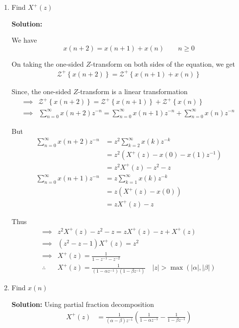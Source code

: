 \documentclass[journal,12pt,twocolumn]{IEEEtran}
\newcommand{\solution}{\noindent \textbf{Solution: }}
\providecommand{\brak}[1]{\ensuremath{\left(#1\right)}}
\providecommand{\cbrak}[1]{\ensuremath{\left\{#1\right\}}}
\providecommand{\abs}[1]{\left\vert#1\right\vert}
\numberwithin{equation}{section}
\renewcommand\thesection{\arabic{section}}
\begin{document}
\begin{enumerate}[label=\thesection.\arabic*,ref=\thesection.\theenumi]
\newpage
\item Find $X^{+}(z)$

\solution 

We have
\begin{equation}
	x(n+2) = x(n+1) + x(n) \qquad n \ge 0
\end{equation}

On taking the one-sided $Z$-transform on both sides of the equation, we get
\begin{align}
	\mathcal{Z}^+\cbrak{x(n+2)} = \mathcal{Z}^+\cbrak{x(n+1) + x(n)}
\end{align}

Since, the one-sided $Z$-transform is a linear transformation
\begin{align}
    \implies &\mathcal{Z}^+\cbrak{x(n + 2)} = \mathcal{Z}^+\cbrak{x(n + 1)} + \mathcal{Z}^+\cbrak{x(n)} \\
    \implies &\sum_{n=0}^\infty x(n+2)z^{-n} = \sum_{n=0}^\infty x(n+1)z^{-n} + \sum_{n=0}^\infty x(n)z^{-n} 
\end{align}

But
\begin{align}
	\sum_{n=0}^\infty x(n+2)z^{-n} &= z^2 \sum_{k=2}^\infty x(k) z^{-k} \\
	&= z^2 \brak{X^+(z) - x(0) - x(1) z^{-1}} \\
	&= z^2 X^+(z) - z^2 - z \\
	\sum_{n=0}^\infty x(n+1)z^{-n} &= z \sum_{k=1}^\infty x(k) z^{-k} \\
	&= z \brak{X^+(z) - x(0)} \\
	&= z X^+(z) - z
\end{align}

Thus
\begin{align}
    \implies&z^2X^+(z) - z^2 - z = zX^+(z) - z + X^+(z) \\
    \implies&\brak{z^2 - z - 1}X^+(z) = z^2 \\
    \implies&X^+(z) = \frac{1}{1 - z^{-1} - z^{-2}} \\
    \therefore&X^+(z) = \frac{1}{\brak{1 - \alpha z^{-1}}\brak{1 - \beta z^{-1}}} \quad |z| > \max\brak{\abs{\alpha}, \abs{\beta}}
\end{align}

\item Find $x(n)$

\solution Using partial fraction decomposition
\begin{align}
	X^+(z) &= \frac{1}{\brak{\alpha - \beta}z^{-1}}\brak{\frac{1}{1 - \alpha z^{-1}} - \frac{1}{1 - \beta z^{-1}}}
\end{align}


\end{enumerate}
\end{document}
